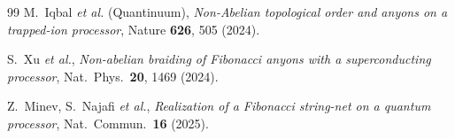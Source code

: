 \documentclass[aps,prx,reprint,amsmath,amssymb,floatfix,nofootinbib,superscriptaddress]{revtex4-2}
\begin{document}
\begin{thebibliography}{99}
M.~Iqbal \emph{et al.} (Quantinuum),
\emph{Non-Abelian topological order and anyons on a trapped-ion processor},
Nature \textbf{626}, 505 (2024).

S.~Xu \emph{et al.},
\emph{Non-abelian braiding of Fibonacci anyons with a superconducting processor},
Nat.\ Phys.\ \textbf{20}, 1469 (2024).

Z.~Minev, S.~Najafi \emph{et al.},
\emph{Realization of a Fibonacci string-net on a quantum processor},
Nat.\ Commun.\ \textbf{16} (2025).

\end{thebibliography}
\end{document}
